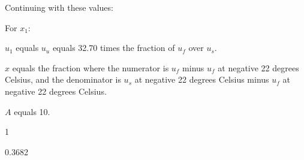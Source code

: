 Continuing with these values:

For \( x_{1} \):

\( u_{1} \) equals \( u_{u} \) equals 32.70 times the fraction of \( u_{f} \) over \( u_{s} \).

\( x \) equals the fraction where the numerator is \( u_{f} \) minus \( u_{f} \) at negative 22 degrees Celsius, and the denominator is \( u_{s} \) at negative 22 degrees Celsius minus \( u_{f} \) at negative 22 degrees Celsius.

\( A \) equals 10.

1

0.3682